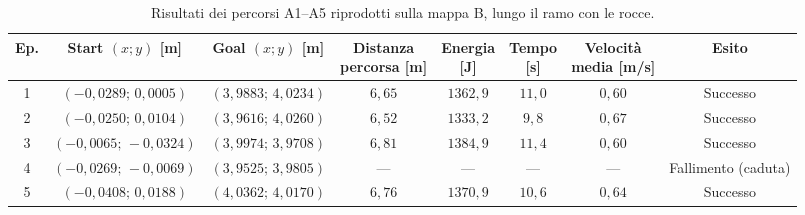 \begin{table}[H]
\centering
\caption{Risultati dei percorsi A1--A5 riprodotti sulla mappa B, lungo il ramo con le rocce.}
\label{tab:exp1-1-rocks-a}
\begingroup
\fontsize{9.5}{11.5}\selectfont
\setlength{\tabcolsep}{2.5pt}
\renewcommand{\arraystretch}{1.25}
\begin{tabular}{@{}c cc cccc c@{}}
\toprule
Ep. & \shortstack{Start $(x;y)$\\{}[m]} & \shortstack{Goal $(x;y)$\\{}[m]} & \shortstack{Distanza\\percorsa [m]} & \shortstack{Energia\\{}[J]} & \shortstack{Tempo\\{}[s]} & \shortstack{Velocità\\media [m/s]} & Esito \\
\midrule
1 & $(-0{,}0289;\,0{,}0005)$ & $(3{,}9883;\,4{,}0234)$ & $6{,}65$ & $1362{,}9$ & $11{,}0$ & $0{,}60$ & Successo \\
2 & $(-0{,}0250;\,0{,}0104)$ & $(3{,}9616;\,4{,}0260)$ & $6{,}52$ & $1333{,}2$ & $9{,}8$ & $0{,}67$ & Successo \\
3 & $(-0{,}0065;\,-0{,}0324)$ & $(3{,}9974;\,3{,}9708)$ & $6{,}81$ & $1384{,}9$ & $11{,}4$ & $0{,}60$ & Successo \\
4 & $(-0{,}0269;\,-0{,}0069)$ & $(3{,}9525;\,3{,}9805)$ & --- & --- & --- & --- & Fallimento (caduta) \\
5 & $(-0{,}0408;\,0{,}0188)$ & $(4{,}0362;\,4{,}0170)$ & $6{,}76$ & $1370{,}9$ & $10{,}6$ & $0{,}64$ & Successo \\
\bottomrule
\end{tabular}
\endgroup
\end{table}

